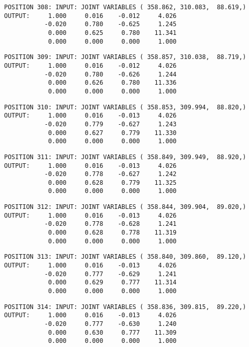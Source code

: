 \begin{verbatim}
POSITION 308: INPUT: JOINT VARIABLES ( 358.862, 310.083,  88.619,)
OUTPUT:     1.000     0.016    -0.012     4.026
           -0.020     0.780    -0.625     1.245
            0.000     0.625     0.780    11.341
            0.000     0.000     0.000     1.000
\end{verbatim} \pagebreak[1]\begin{verbatim}
POSITION 309: INPUT: JOINT VARIABLES ( 358.857, 310.038,  88.719,)
OUTPUT:     1.000     0.016    -0.012     4.026
           -0.020     0.780    -0.626     1.244
            0.000     0.626     0.780    11.336
            0.000     0.000     0.000     1.000
\end{verbatim} \pagebreak[1]\begin{verbatim}
POSITION 310: INPUT: JOINT VARIABLES ( 358.853, 309.994,  88.820,)
OUTPUT:     1.000     0.016    -0.013     4.026
           -0.020     0.779    -0.627     1.243
            0.000     0.627     0.779    11.330
            0.000     0.000     0.000     1.000
\end{verbatim} \pagebreak[1]\begin{verbatim}
POSITION 311: INPUT: JOINT VARIABLES ( 358.849, 309.949,  88.920,)
OUTPUT:     1.000     0.016    -0.013     4.026
           -0.020     0.778    -0.627     1.242
            0.000     0.628     0.779    11.325
            0.000     0.000     0.000     1.000
\end{verbatim} \pagebreak[1]\begin{verbatim}
POSITION 312: INPUT: JOINT VARIABLES ( 358.844, 309.904,  89.020,)
OUTPUT:     1.000     0.016    -0.013     4.026
           -0.020     0.778    -0.628     1.241
            0.000     0.628     0.778    11.319
            0.000     0.000     0.000     1.000
\end{verbatim} \pagebreak[1]\begin{verbatim}
POSITION 313: INPUT: JOINT VARIABLES ( 358.840, 309.860,  89.120,)
OUTPUT:     1.000     0.016    -0.013     4.026
           -0.020     0.777    -0.629     1.241
            0.000     0.629     0.777    11.314
            0.000     0.000     0.000     1.000
\end{verbatim} \pagebreak[1]\begin{verbatim}
POSITION 314: INPUT: JOINT VARIABLES ( 358.836, 309.815,  89.220,)
OUTPUT:     1.000     0.016    -0.013     4.026
           -0.020     0.777    -0.630     1.240
            0.000     0.630     0.777    11.309
            0.000     0.000     0.000     1.000
\end{verbatim} \pagebreak[1]\begin{verbatim}

\end{verbatim}
